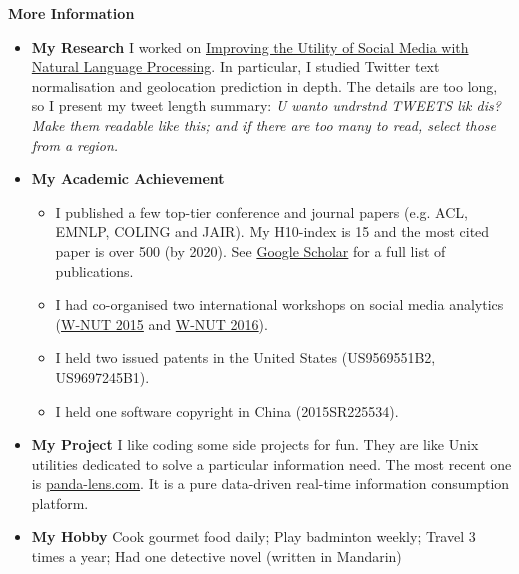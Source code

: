 \documentclass[letterpaper,12pt]{article}[leftmargin=*]
\def \entryspacing {-0pt}
\renewcommand{\section}[2]{\vspace{5pt}
  \colorbox{secondary}{\color{white}\raggedbottom\normalsize\textbf{{#1}{\hspace{7pt}#2}}}
}
\newcommand{\resumeEntryStart}{\begin{itemize}[leftmargin=2.5mm]}
\newcommand{\resumeEntryEnd}{\end{itemize}\vspace{\entryspacing}}
\newcommand{\resumeItemListStart}{\begin{itemize}[leftmargin=4.5mm]}
\newcommand{\resumeItemListEnd}{\end{itemize}}
\newcommand{\resumeItem}[1]{
  \item\small{
    {#1 \vspace{-2pt}}
  }
}
\newcommand{\resumeEntryS}[2]{
  \item[]\small{
    \textbf{\color{primary}#1 }{ #2 \vspace{-6pt}}
  }
}
\begin{document}
\section{\faGears}{More Information}

 \resumeEntryStart
  \resumeEntryS{My Research}{I worked on \href{https://minerva-access.unimelb.edu.au/bitstream/handle/11343/41029/thesis.pdf?sequence=1}{Improving the Utility of Social Media with Natural Language Processing}. In particular, I studied Twitter text normalisation and geolocation prediction in depth. The details are too long, so I present my tweet length summary: \textit{U wanto undrstnd TWEETS lik dis? Make them readable like this; and if there are too many to read, select those from a region.}}
\resumeEntryS{My Academic Achievement}{
    \resumeItemListStart
      \resumeItem {I published a few top-tier conference and journal papers (e.g. ACL, EMNLP, COLING and JAIR). My H10-index is 15 and the most cited paper is over 500 (by 2020). See \href{https://scholar.google.com/citations?hl=en&user=ZRr4vn8AAAAJ}{Google Scholar} for a full list of publications.}
      \resumeItem {I had co-organised two international workshops on social media analytics (\href{https://noisy-text.github.io/2015/}{W-NUT 2015} and \href{https://noisy-text.github.io/2015/}{W-NUT 2016}).}
      \resumeItem {I held two issued patents in the United States (US9569551B2, US9697245B1).}
      \resumeItem {I held one software copyright in China (2015SR225534).}
    \resumeItemListEnd}

  \resumeEntryS{My Project} {I like coding some side projects for fun. They are like Unix utilities dedicated to solve a particular information need. The most recent one is \href{http://panda-lens.com/}{panda-lens.com}. It is a pure data-driven real-time information consumption platform.}
  \resumeEntryS{My Hobby} {Cook gourmet food daily; Play badminton weekly; Travel 3 times a year; Had one detective novel (written in Mandarin)}
 \resumeEntryEnd
\end{document}
